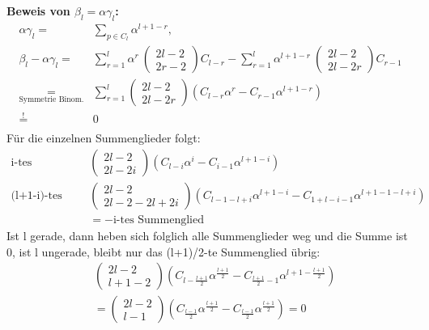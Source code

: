 \documentclass[a4paper, 11pt]{scrreprt}
\newenvironment{beweis}[1][Beweis]{\begin{trivlist}
	\item[\hskip \labelsep {\bfseries #1}]}
	{\end{trivlist}}
\begin{document}
\begin{beweis}
\textbf{Beweis von  $\beta_{l}= \alpha \gamma_{l}$:}
\begin{align*}
\alpha \gamma_{l} =& \sum_{p \in C_l} \alpha^{l+1-r},\\
\beta_l - \alpha \gamma_l =& \sum_{r=1}^{l} \alpha^r\ \begin{pmatrix} 2l-2\\2r-2\end{pmatrix} C_{l-r} - \sum_{r=1}^{l} \alpha^{l+1-r}\ \begin{pmatrix} 2l-2\\2l-2r\end{pmatrix} C_{r-1}   \\ 
\underset{\text{Symmetrie Binom.}}{=}& \sum_{r=1}^{l} \begin{pmatrix} 2l-2\\2l-2r\end{pmatrix} \left( C_{l-r} \alpha^r - C_{r-1}\alpha^{l+1-r} \right) \\
\overset{!}{=}& 0 \\
\end{align*}
Für die einzelnen Summenglieder folgt:
\begin{align*}
\text{i-tes Summenglied:} &\begin{pmatrix} 2l-2\\2l-2i\end{pmatrix} \left( C_{l-i} \alpha^i - C_{i-1}\alpha^{l+1-i} \right) \\
\text{(l+1-i)-tes Summenglied:}& \begin{pmatrix} 2l-2\\2l-2-2l+2i\end{pmatrix} \left( C_{l-1-l+i} \alpha^{l+1-i} - C_{1+l-i-1}\alpha^{l+1-1-l+i} \right)\\
 &= - \text{i-tes Summenglied}  
\end{align*}
Ist l gerade, dann heben sich folglich alle Summenglieder weg und die Summe ist 0, ist l ungerade, bleibt nur das (l+1)/2-te Summenglied übrig:
\begin{align*}
 &\begin{pmatrix} 2l-2\\l+1-2\end{pmatrix} \left( C_{l-\frac{l+1}{2}} \alpha^{\frac{l+1}{2}} - C_{\frac{l+1}{2} -1}\alpha^{l+1-\frac{l+1}{2}} \right)\\
&=\begin{pmatrix} 2l-2\\l-1\end{pmatrix} \left( C_{\frac{l-1}{2}} \alpha^{\frac{l+1}{2}} - C_{\frac{l-1}{2}}\alpha^{\frac{l+1}{2}} \right)=0
\end{align*}


\end{beweis}
\end{document}
